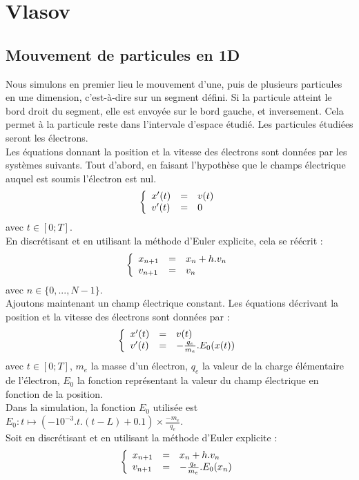 \documentclass{article}
\begin{document}
\section*{Vlasov}
\subsection*{Mouvement de particules en 1D}
Nous simulons en premier lieu le mouvement d'une, puis de plusieurs particules en une dimension, c'est-à-dire sur un segment défini. Si la particule atteint le bord droit du segment, elle est envoyée sur le bord gauche, et inversement. Cela permet à la particule reste dans l'intervale d'espace étudié. Les particules étudiées seront les électrons.\\
Les équations donnant la position et la vitesse des électrons sont données par les systèmes suivants. Tout d'abord, en faisant l'hypothèse que le champs électrique auquel est soumis l'électron est nul.
$$
\left \{
   \begin{array}{l l l}
      x'(t)  & = & v(t) \\
      v'(t)  & = & 0 \\
	\end{array}
\right.
$$
avec $t \in [0;T]$.\\
En discrétisant et en utilisant la méthode d'Euler explicite, cela se réécrit :
$$
\left \{
   \begin{array}{l l l}
      x_{n+1}  & = & x_n + h.v_n \\
      v_{n+1}  & = & v_n \\
	\end{array}
\right.
$$
avec $n \in \{0,...,N-1\}$.\\
Ajoutons maintenant un champ électrique constant. Les équations décrivant la position et la vitesse des électrons sont données par :
$$
\left \{
   \begin{array}{l l l}
      x'(t)  & = & v(t) \\
      v'(t)  & = & -\frac{q_e}{m_e}.E_0(x(t)) \\
	\end{array}
\right.
$$
avec $t \in [0;T]$, $m_e$ la masse d'un électron, $q_e$ la valeur de la charge élémentaire de l'électron, $E_0$ la fonction représentant la valeur du champ électrique en fonction de la position.\\
Dans la simulation, la fonction $E_0$ utilisée est $E_0 : t \mapsto (-10^{-3}.t.(t-L) + 0.1) \times \frac{-m_e}{q_e}$.\\
Soit en discrétisant et en utilisant la méthode d'Euler explicite :
$$
\left \{
   \begin{array}{l l l}
      x_{n+1}  & = & x_n + h.v_n \\
      v_{n+1}  & = & -\frac{q_e}{m_e}.E_0(x_n) \\
	\end{array}
\right.
$$
\end{document}
